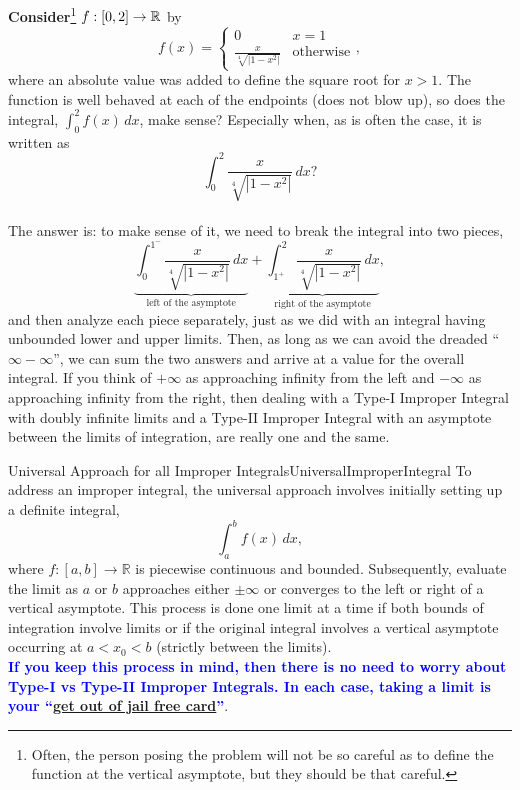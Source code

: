 \bigskip
\textbf{Consider}\footnote{Often, the person posing the problem will not be so careful as to define the function at the vertical asymptote, but they should be that careful.}  $f:[0, 2] \to \mathbb R$ by 
$$f(x) = \begin{cases} 
0 & x=1 \\
\frac{x}{ \sqrt[4]{|1-x^2|} } & \text{otherwise}
\end{cases},$$ where an absolute value was added to define the square root for $x>1$. The function is well behaved at each of the endpoints (does not blow up), so does the integral, $ \int_0^2 f(x) \, dx$, make sense? Especially when, as is often the case, it is written as 
$$ \int_0^2 \frac{x}{ \sqrt[4]{|1-x^2|} }  \, dx ?$$\\

The answer is: to make sense of it, we need to break the integral into two pieces, 
$$ \underbrace{\int_0^{1^-} \frac{x}{ \sqrt[4]{|1-x^2|} }  \, dx}_{\text{left of the asymptote}} + \underbrace{\int_{1^+}^2 \frac{x}{ \sqrt[4]{|1-x^2|} }  \, dx}_{\text{right of the asymptote}},$$
and then analyze each piece separately, just as we did with an integral having unbounded lower and upper limits. Then, as long as we can avoid the dreaded ``$\infty - \infty$'', we can sum the two answers and arrive at a value for the overall integral. If you think of $+\infty$ as approaching infinity from the left and $-\infty$ as approaching infinity from the right, then dealing with a Type-I Improper Integral with doubly infinite limits and a Type-II Improper Integral with an asymptote between the limits of integration, are really one and the same.

\begin{factColor}{Universal Approach for all Improper Integrals}{UniversalImproperIntegral}
To address an improper integral, the universal approach involves initially setting up a definite integral,
$$ \int_a^b f(x) \, dx, $$
where \( f: [a, b] \to \mathbb{R} \) is piecewise continuous and bounded. Subsequently,  evaluate the limit as \( a \) or \( b \) approaches either \( \pm \infty \) or converges to the left or right of a vertical asymptote. This process is done one limit at a time if both bounds of integration involve limits or if the original integral involves a vertical asymptote occurring at $a < x_0 < b$ (strictly between the limits).\\

\textcolor{blue}{\bf If you keep this process in mind, then there is no need to worry about Type-I vs Type-II Improper Integrals. In each case, taking a limit is your ``\href{https://en.wikipedia.org/wiki/Get_Out_of_Jail_Free_card}{get out of jail free card}''}. 
\end{factColor}


